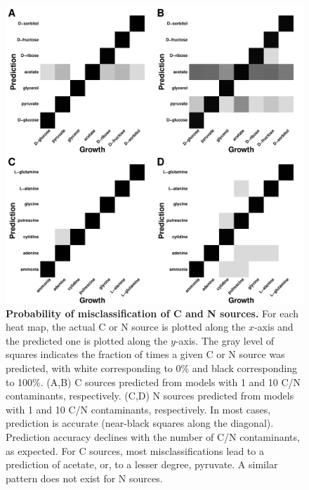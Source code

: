 \documentclass[12pt]{article}
\begin{document}
\clearpage
\begin{figure}[p]
\centerline{\includegraphics[width=6in]{Figures/heatmap.pdf}}
\caption{\label{fig:heat_map}\textbf{Probability of misclassification of C and N sources.} For each heat map, the actual C or N source is plotted along the $x$-axis and the predicted one is plotted along the $y$-axis. The gray level of squares indicates the fraction of times a given C or N source was predicted, with white corresponding to 0\% and black corresponding to 100\%. (A,B) C sources predicted from models with 1 and 10 C/N contaminants, respectively. (C,D) N sources predicted from models with 1 and 10 C/N contaminants, respectively. In most cases, prediction is accurate (near-black squares along the diagonal). Prediction accuracy declines with the number of C/N contaminants, as expected. For C sources, most misclassifications lead to a prediction of acetate, or, to a lesser degree, pyruvate. A similar pattern does not exist for N sources.}
\end{figure}
\end{document}
